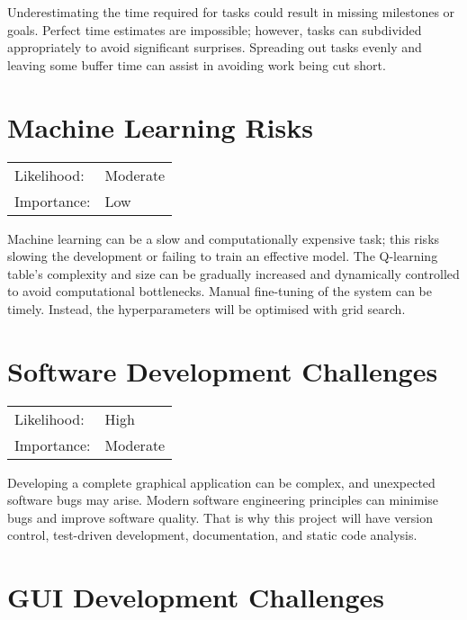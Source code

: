 \documentclass[]{final_report}
\begin{document}
Underestimating the time required for tasks could result in missing milestones or goals. Perfect time estimates are impossible; however, tasks can subdivided appropriately to avoid significant surprises. Spreading out tasks evenly and leaving some buffer time can assist in avoiding work being cut short. 

\section{Machine Learning Risks}

\begin{center}
    \begin{tabular}{l l  }
    Likelihood: & Moderate \\
    Importance: & Low \\
    \end{tabular}
  \end{center}

Machine learning can be a slow and computationally expensive task; this risks slowing the development or failing to train an effective model. The Q-learning table's complexity and size can be gradually increased and dynamically controlled to avoid computational bottlenecks. Manual fine-tuning of the system can be timely. Instead, the hyperparameters will be optimised with grid search. 

\section{Software Development Challenges}

\begin{center}
    \begin{tabular}{l l  }
    Likelihood: & High \\
    Importance: & Moderate \\
    \end{tabular}
  \end{center}

Developing a complete graphical application can be complex, and unexpected software bugs may arise. Modern software engineering principles can minimise bugs and improve software quality. That is why this project will have version control, test-driven development, documentation, and static code analysis. 

\section{GUI Development Challenges}
\end{document}
